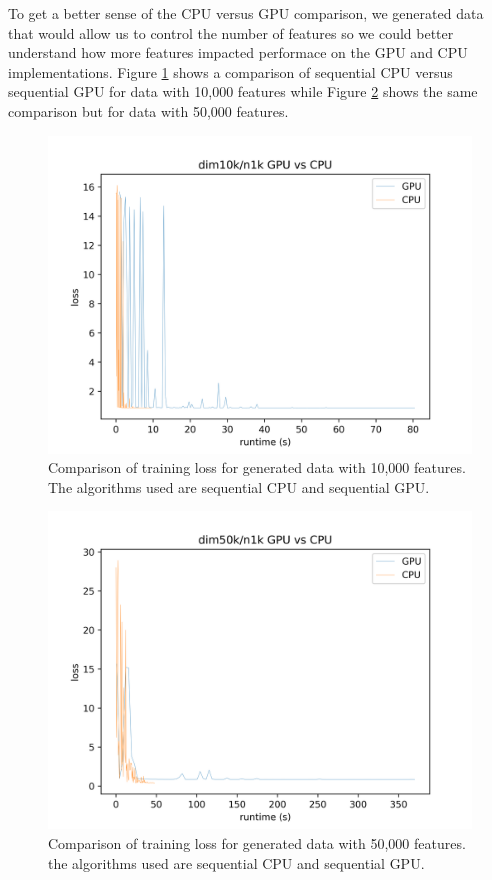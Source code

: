\documentclass{article}
\begin{document}
To get a better sense of the CPU versus GPU comparison, we generated data that
would allow us to control the number of features so we could better understand
how more features impacted performace on the GPU and CPU implementations. Figure
\ref{fig:10k} shows a comparison of sequential CPU versus sequential GPU for
data with 10,000 features while Figure \ref{fig:50k} shows the same comparison
but for data with 50,000 features.

\begin{figure}
  \centering
  \includegraphics[scale=0.65]{dim10k_CPU_GPU}
  \caption{Comparison of training loss for generated data with 10,000
    features. The algorithms used are sequential CPU and sequential GPU.}
  \label{fig:10k}
\end{figure}

\begin{figure}
	  \label{fig:50k}
  \centering
  \includegraphics[scale=0.65]{dim50k_CPU_GPU}
  \caption{Comparison of training loss for generated data with 50,000
    features. the algorithms used are sequential CPU and sequential GPU.}
  \end{figure}
\end{document}
